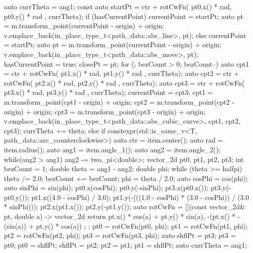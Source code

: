 \begin{codeblock}
{{{        auto currTheta = ang1;
        const auto startPt =
        ctr + rotCwFn({ pt0.x() * rad, pt0.y() * rad }, currTheta);
        if (hasCurrentPoint) {
          currentPoint = startPt;
          auto pt = m.transform_point(currentPoint - origin) + origin;
          v.emplace_back(in_place_type_t<path_data::abs_line>, pt);
        }
        else {
          currentPoint = startPt;
          auto pt = m.transform_point(currentPoint - origin) + origin;
          v.emplace_back(in_place_type_t<path_data::abs_move>, pt);
          hasCurrentPoint = true;
          closePt = pt;
        }
        for (; bezCount > 0; bezCount--) {
          auto cpt1 = ctr + rotCwFn({ pt1.x() * rad, pt1.y() * rad }, currTheta);
          auto cpt2 = ctr + rotCwFn({ pt2.x() * rad, pt2.y() * rad },
            currTheta);
          auto cpt3 = ctr + rotCwFn({ pt3.x() * rad, pt3.y() * rad },
            currTheta);
          currentPoint = cpt3;
          cpt1 = m.transform_point(cpt1 - origin) + origin;
          cpt2 = m.transform_point(cpt2 - origin) + origin;
          cpt3 = m.transform_point(cpt3 - origin) + origin;
          v.emplace_back(in_place_type_t<path_data::abs_cubic_curve>, cpt1,
            cpt2, cpt3);
          currTheta += theta;
        }
      }
      else if constexpr(std::is_same_v<T, path_data::arc_counterclockwise>) {
      {
        auto ctr = item.center();
        auto rad = item.radius();
        auto ang1 = item.angle_1();
        auto ang2 = item.angle_2();
        while(ang2 > ang1) {
          ang2 -= two_pi<double>;
        }
        vector_2d pt0, pt1, pt2, pt3;
        int bezCount = 1;
        double theta = ang1 - ang2;
        double phi;
        while (theta >= halfpi) {
          theta /= 2.0;
          bezCount += bezCount;
        }
        phi = theta / 2.0;
        auto cosPhi = cos(phi);
        auto sinPhi = sin(phi);
        pt0.x(cosPhi);
        pt0.y(-sinPhi);
        pt3.x(pt0.x());
        pt3.y(-pt0.y());
        pt1.x((4.0 - cosPhi) / 3.0);
        pt1.y(-(((1.0 - cosPhi) * (3.0 - cosPhi)) / (3.0 * sinPhi)));
        pt2.x(pt1.x());
        pt2.y(-pt1.y());
        auto rotCwFn = [](const vector_2d& pt, double a) -> vector_2d {
          return { pt.x() * cos(a) + pt.y() * sin(a),
            -(pt.x() * -(sin(a)) + pt.y() * cos(a)) };
        };
        pt0 = rotCwFn(pt0, phi);
        pt1 = rotCwFn(pt1, phi);
        pt2 = rotCwFn(pt2, phi);
        pt3 = rotCwFn(pt3, phi);
        auto shflPt = pt3;
        pt3 = pt0;
        pt0 = shflPt;
        shflPt = pt2;
        pt2 = pt1;
        pt1 = shflPt;
        auto currTheta = ang1;
}}}}
\end{codeblock}
